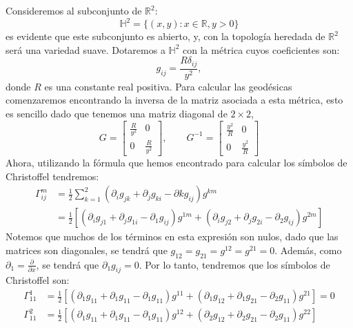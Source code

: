 \begin{example}
	Consideremos al subconjunto de $\mathbb{R}^2$:
	\[
		\mathbb{H}^{2} = \{(x,y): x \in \mathbb{R}, y > 0\}
	\]
	es evidente que este subconjunto es abierto, y, con la topología heredada de $\mathbb{R}^{2}$ será una variedad suave. Dotaremos a $\mathbb{H}^{2}$ con la métrica cuyos coeficientes son:
	\[
		g_{ij} = \frac{R\delta_{ij}}{y^{2}},
	\]
	donde $R$ es una constante real positiva. Para calcular las geodésicas comenzaremos encontrando la inversa de la matriz asociada a esta métrica, esto es sencillo dado que tenemos una matriz diagonal de $2 \times 2$,
	\[
		G = \begin{bmatrix}
			\frac{R}{y^2} & 0             \\[12pt]
			0             & \frac{R}{y^2}
		\end{bmatrix},
		\qquad
		G^{-1} = \begin{bmatrix}
			\frac{y^2}{R} & 0               \\[12pt]
			0             & \frac{y^{2}}{R}
		\end{bmatrix}
	\]
	Ahora, utilizando la fórmula que hemos encontrado para calcular los símbolos de Christoffel tendremos:
	\begin{align*}
		\Gamma_{ij}^{m} & = \frac{1}{2} \sum_{k=1}^{2}
		(\partial_{i}g_{jk} + \partial_{j}g_{ki} - \partial{k}g_{ij}) g^{km} \\
		                & = \frac{1}{2} \left[
		(\partial_{i}g_{j1} + \partial_{j}g_{1i} - \partial_{1}g_{ij})g^{1m} + (\partial_{i}g_{j2} + \partial_{j}g_{2i} - \partial_{2}g_{ij})g^{2m}
		\right]
	\end{align*}
	Notemos que muchos de los términos en esta expresión son nulos, dado que las matrices son diagonales, se tendrá que $g_{12} = g_{21} = g^{12} = g^{21} = 0$. Además, como $\partial_{1} = \frac{\partial}{\partial x}$, se tendrá que $\partial_{1} g_{ij} = 0$. Por lo tanto, tendremos que los símbolos de Christoffel son:
	\begin{align*}
		\Gamma_{11}^{1} & = \frac{1}{2}\left[
		(\partial_{1}g_{11} + \partial_{1}g_{11} - \partial_{1}g_{11})g^{11}
		+ (\partial_{1}g_{12} + \partial_{1}g_{21} - \partial_{2}g_{11})g^{21}
		\right] = 0                                                                     \\
		\Gamma_{11}^{2} & = \frac{1}{2}\left[
		(\partial_{1}g_{11} + \partial_{1}g_{11} - \partial_{1}g_{11})g^{12}
		+ (\partial_{2}g_{12} + \partial_{2}g_{21} - \partial_{2}g_{11})g^{22}
		\right]                                                                         \\

\end{align*}
\end{example}
